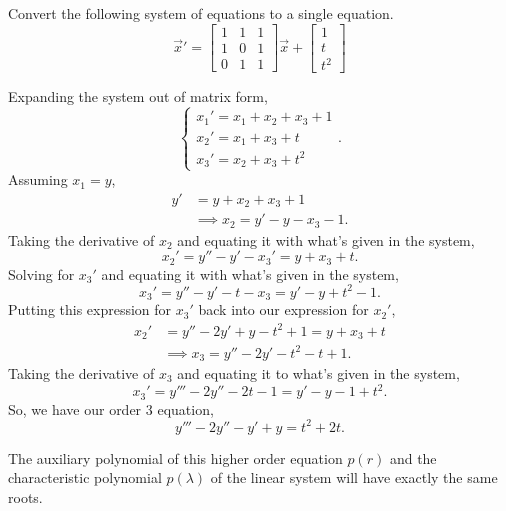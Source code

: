 \begin{example}
	Convert the following system of equations to a single equation.
	\begin{equation*}
		\vec{x}' = \begin{bmatrix}
			1 & 1 & 1 \\
			1 & 0 & 1 \\
			0 & 1 & 1
		\end{bmatrix}\vec{x} + \begin{bmatrix}
			1 \\
			t \\
			t^2
		\end{bmatrix}
	\end{equation*}
\end{example}
\noindent
Expanding the system out of matrix form,
\begin{equation*}
	\begin{cases}
		x_1' = x_1 + x_2 + x_3 + 1 \\
		x_2' = x_1 + x_3 + t \\
		x_3' = x_2 + x_3 + t^2 
	\end{cases}.
\end{equation*}
Assuming $x_1 = y$,
\begin{align*}
	y' &= y + x_2 + x_3 + 1 \\
	&\implies x_2 = y' - y - x_3 - 1.
\end{align*}
Taking the derivative of $x_2$ and equating it with what's given in the system,
\begin{equation*}
	x_2' = y'' - y' - x_3' = y + x_3 + t.
\end{equation*}
Solving for $x_3'$ and equating it with what's given in the system,
\begin{equation*}
	x_3' = y'' - y' - t - x_3 = y' - y + t^2 - 1.
\end{equation*}
Putting this expression for $x_3'$ back into our expression for $x_2'$,
\begin{align*}
	x_2' &= y'' - 2y' + y - t^2 + 1 = y + x_3 + t \\
	&\implies x_3 = y'' - 2y' - t^2 - t + 1.
\end{align*}
Taking the derivative of $x_3$ and equating it to what's given in the system,
\begin{equation*}
	x_3' = y''' - 2y'' - 2t - 1 = y' - y - 1 + t^2.
\end{equation*}
So, we have our order 3 equation,
\begin{equation*}
	y''' - 2y'' - y' + y = t^2 + 2t.
\end{equation*}

\noindent
The auxiliary polynomial of this higher order equation $p(r)$ and the characteristic polynomial $p(\lambda)$ of the linear system will have exactly the same roots.